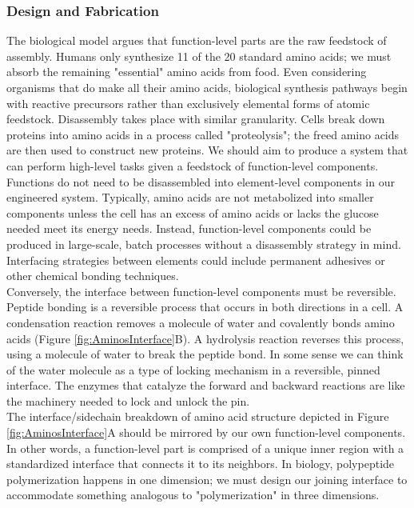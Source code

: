 {\subsubsection{Design and Fabrication}

The biological model argues that function-level parts are the raw feedstock of assembly.  Humans only synthesize 11 of the 20 standard amino acids; we must absorb the remaining "essential" amino acids from food.  Even considering organisms that do make all their amino acids, biological synthesis pathways begin with reactive precursors rather than exclusively elemental forms of atomic feedstock.  Disassembly takes place with similar granularity.  Cells break down proteins into amino acids in a process called "proteolysis"; the freed amino acids are then used to construct new proteins.  We should aim to produce a system that can perform high-level tasks given a feedstock of function-level components.\\

Functions do not need to be disassembled into element-level components in our engineered system.  Typically, amino acids are not metabolized into smaller components unless the cell has an excess of amino acids or lacks the glucose needed meet its energy needs\cite{Stryer1988}.  Instead, function-level components could be produced in large-scale, batch processes without a disassembly strategy in mind.  Interfacing strategies between elements could include permanent adhesives or other chemical bonding techniques.\\

Conversely, the interface between function-level components must be reversible.  Peptide bonding is a reversible process that occurs in both directions in a cell.  A condensation reaction removes a molecule of water and covalently bonds amino acids (Figure \ref{fig:AminosInterface}B).  A hydrolysis reaction reverses this process, using a molecule of water to break the peptide bond.  In some sense we can think of the water molecule as a type of locking mechanism in a reversible, pinned interface.  The enzymes that catalyze the forward and backward reactions are like the machinery needed to lock and unlock the pin.\\

The interface/sidechain breakdown of amino acid structure depicted in Figure \ref{fig:AminosInterface}A should be mirrored by our own function-level components.  In other words, a function-level part is comprised of a unique inner region with a standardized interface that connects it to its neighbors.  In biology, polypeptide polymerization happens in one dimension; we must design our joining interface to accommodate something analogous to "polymerization" in three dimensions.\\

}
